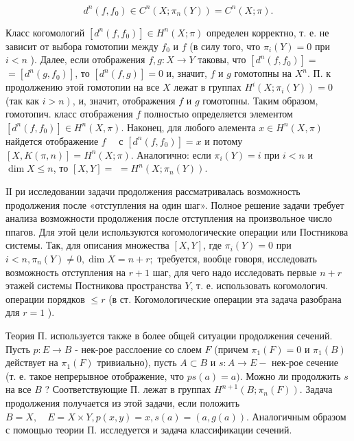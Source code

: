 \documentclass[10pt]{article}
\begin{document}
\[

d^{n}\left(f, f_{0}\right) \in C^{n}\left(X ; \pi_{n}(Y)\right)=C^{n}(X ; \pi) .

\]



Класс когомологий $\left[d^{n}\left(f, f_{0}\right)\right] \in H^{n}(X ; \pi)$ определен корректно, т. е. не зависит от выбора гомотопии между $f_{0}$ и $f$ (в силу того, что $\pi_{i}(Y)=0$ при $i<n$ ). Далее, если отображения $f, g: X \rightarrow Y$ таковы, что $\left[d^{n}\left(f, f_{0}\right)\right]=$ $=\left[d^{n}\left(g, f_{0}\right)\right]$, то $\left[d^{n}(f, g)\right]=0$ и, значит, $f$ и $g$ гомотопны на $X^{n}$. П. к продолжению этой гомотопии на все $X$ лежат в группах $H^{i}\left(X ; \pi_{i}(Y)\right)=0$ (так как $\left.i>n\right)$, и, значит, отображения $f$ и $g$ гомотопны. Таким образом, гомотопич. класс отображения $f$ полностью определяется элементом $\left[d^{n}\left(f, f_{0}\right)\right] \in H^{n}(X, \pi)$. Наконец, для любого әлемента $x \in H^{n}(X, \pi)$ найдется отображение $f \quad$ с $\left[d^{n}\left(f, f_{0}\right)\right]=x$ и потому $[X, K(\pi, n)]=H^{n}(X ; \pi)$. Аналогично: если $\pi_{i}(Y)=i$ при $i<n$ и $\operatorname{dim} X \leqslant n$, то $[X, Y]=$ $=H^{n}\left(X ; \pi_{n}(Y)\right)$.



IІ ри исследовании задачи продолжения рассматривалась возможность продолжения после «отступления на один шаг». Полное решение задачи требует анализа возможности продолжения после отступления на произвольное число ппагов. Для этой цели используются когомологические операции или Постникова системы. Так, для описания множества $[X, Y]$, где $\pi_{i}(Y)=0$ при $i<n, \pi_{n}(Y) \neq 0, \operatorname{dim} X=n+r ;$ требуется, вообце говоря, исследовать возможность отступления на $r+1$ шаг, для чего надо исследовать первые $n+r$ этажей системы Постникова пространства $Y$, т. е. использовать когомологич. операции порядков $\leqslant r$ (в ст. Когомологические операции эта задача разобрана для $r=1$ ).



Теория П. используется также в более общей ситуации продолжения сечений. Пусть $p: E \rightarrow B$ - нек-рое расслоение со слоем $F$ (причем $\pi_{1}(F)=0$ и $\pi_{1}(B)$ действует на $\pi_{1}(F)$ тривиально), пусть $A \subset B$ и $s: A \rightarrow E-$ нек-рое сечение (т. е. такое непрерывное отображение, что $p s(a)=a)$. Можно ли продолжить $s$ на все $B$ ? Соответствующие П. лежат в группах $H^{n+1}\left(B ; \pi_{n}(F)\right)$. Задача продолжения получается из этой задачи, если положить $B=X, \quad E=X \times Y, p(x, y)=x, s(a)=(a, g(a))$. Аналогичным образом с помощью теории П. исследуется и задача классификации сечений.
\end{document}

